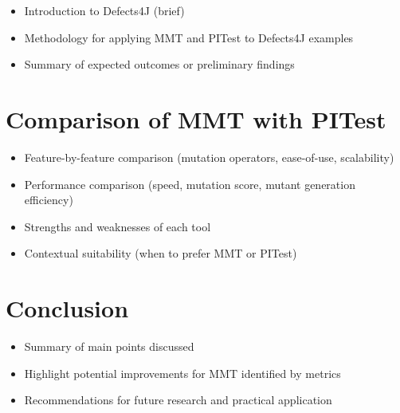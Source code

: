 \documentclass[12pt,a4paper]{article}
\begin{document}
\begin{itemize}
	\item Introduction to Defects4J (brief)
	\item Methodology for applying MMT and PITest to Defects4J examples
	\item Summary of expected outcomes or preliminary findings
\end{itemize}

\newpage
\section{Comparison of MMT with PITest}
\begin{itemize}
	\item Feature-by-feature comparison (mutation operators, ease-of-use,
	      scalability)
	\item Performance comparison (speed, mutation score, mutant generation
	      efficiency)
	\item Strengths and weaknesses of each tool
	\item Contextual suitability (when to prefer MMT or PITest)
\end{itemize}

\newpage
\section{Conclusion}
\begin{itemize}
	\item Summary of main points discussed
	\item Highlight potential improvements for MMT identified by metrics
	\item Recommendations for future research and practical application
\end{itemize}

\newpage
\printbibliography
\end{document}
